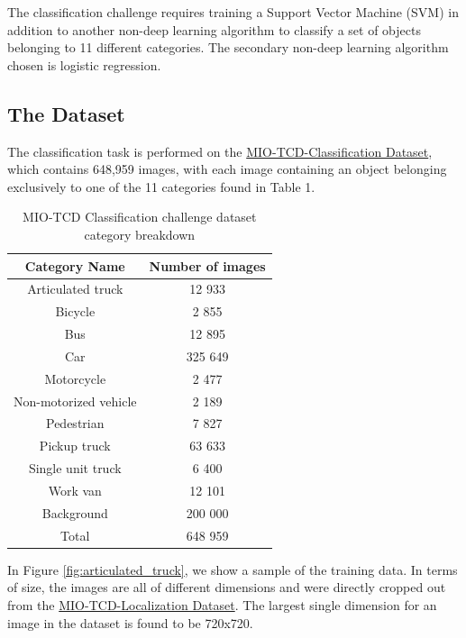 \documentclass[12pt]{article}
\begin{document}
The classification challenge requires training a Support Vector Machine (SVM) in addition to another non-deep learning algorithm to classify a set of objects belonging to 11 different categories. The secondary non-deep learning algorithm chosen is logistic regression.

\subsection{The Dataset}

The classification task is performed on the \href{http://podoce.dinf.usherbrooke.ca/static/dataset/MIO-TCD-Classification.tar}{MIO-TCD-Classification Dataset}, which contains 648,959 images, with each image containing an object belonging exclusively to one of the 11 categories found in Table 1. 

    \begin{table}[h] 
    \centering
        \begin{tabular}{ || c | c ||}
            \hline
            \hline
            Category Name           & Number of images \\
            \hline
            Articulated truck       & 12 933    \\
            Bicycle                 & 2 855     \\
            Bus                     & 12 895    \\
            Car                     & 325 649   \\
            Motorcycle              & 2 477     \\
            Non-motorized vehicle   & 2 189     \\
            Pedestrian              & 7 827     \\
            Pickup truck            & 63 633    \\
            Single unit truck       & 6 400     \\
            Work van                & 12 101    \\
            Background              & 200 000   \\
            \hline
            Total                   & 648 959   \\
            \hline
            \hline
        \end{tabular}
    \caption{MIO-TCD Classification challenge dataset category breakdown}
    \end{table}

In Figure \ref{fig:articulated_truck}, we show a sample of the training data. In terms of size, the images are all of different dimensions and were directly cropped out from the \href{http://podoce.dinf.usherbrooke.ca/static/dataset/MIO-TCD-Classification.tar}{MIO-TCD-Localization Dataset}. The largest single dimension for an image in the dataset is found to be 720x720.
\end{document}
